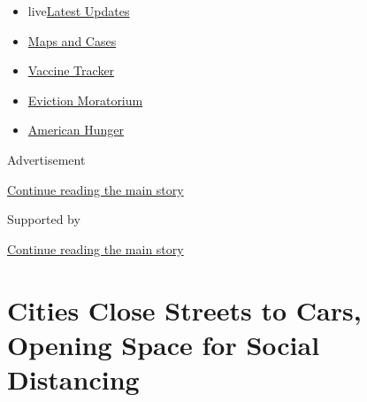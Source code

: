 \begin{itemize}
\tightlist
\item
  live\href{https://www.nytimes3xbfgragh.onion/2020/09/08/world/covid-19-coronavirus.html?name=styln-coronavirus-national\&region=TOP_BANNER\&block=storyline_menu_recirc\&action=click\&pgtype=Article\&impression_id=7f7116a0-f1d4-11ea-ad2b-99be98891f0b\&variant=undefined}{Latest
  Updates}
\item
  \href{https://www.nytimes3xbfgragh.onion/interactive/2020/us/coronavirus-us-cases.html?name=styln-coronavirus-national\&region=TOP_BANNER\&block=storyline_menu_recirc\&action=click\&pgtype=Article\&impression_id=7f7116a1-f1d4-11ea-ad2b-99be98891f0b\&variant=undefined}{Maps
  and Cases}
\item
  \href{https://www.nytimes3xbfgragh.onion/interactive/2020/science/coronavirus-vaccine-tracker.html?name=styln-coronavirus-national\&region=TOP_BANNER\&block=storyline_menu_recirc\&action=click\&pgtype=Article\&impression_id=7f7116a2-f1d4-11ea-ad2b-99be98891f0b\&variant=undefined}{Vaccine
  Tracker}
\item
  \href{https://www.nytimes3xbfgragh.onion/2020/09/02/your-money/eviction-moratorium-covid.html?name=styln-coronavirus-national\&region=TOP_BANNER\&block=storyline_menu_recirc\&action=click\&pgtype=Article\&impression_id=7f7116a3-f1d4-11ea-ad2b-99be98891f0b\&variant=undefined}{Eviction
  Moratorium}
\item
  \href{https://www.nytimes3xbfgragh.onion/interactive/2020/09/02/magazine/food-insecurity-hunger-us.html?name=styln-coronavirus-national\&region=TOP_BANNER\&block=storyline_menu_recirc\&action=click\&pgtype=Article\&impression_id=7f713db0-f1d4-11ea-ad2b-99be98891f0b\&variant=undefined}{American
  Hunger}
\end{itemize}

Advertisement

\protect\hyperlink{after-top}{Continue reading the main story}

Supported by

\protect\hyperlink{after-sponsor}{Continue reading the main story}

\hypertarget{cities-close-streets-to-cars-opening-space-for-social-distancing}{%
\section{Cities Close Streets to Cars, Opening Space for Social
Distancing}\label{cities-close-streets-to-cars-opening-space-for-social-distancing}}

